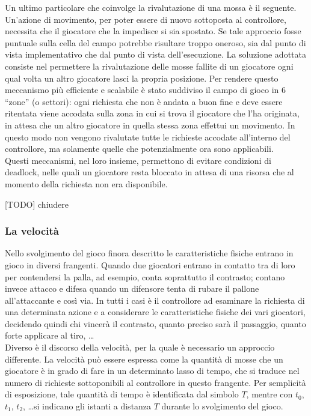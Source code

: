 Un ultimo particolare che coinvolge la rivalutazione di una mossa è il seguente. Un'azione di movimento, per poter essere di nuovo sottoposta al controllore, necessita che il giocatore che la impedisce si sia spostato. Se tale approccio fosse puntuale sulla cella del campo potrebbe risultare troppo oneroso, sia dal punto di vista implementativo che dal punto di vista dell'esecuzione. La soluzione adottata consiste nel permettere la rivalutazione delle mosse fallite di un giocatore ogni qual volta un altro giocatore lasci la propria posizione. Per rendere questo meccanismo più efficiente e scalabile è stato suddiviso il campo di gioco in 6 ``zone'' (o settori): ogni richiesta che non è andata a buon fine e deve essere ritentata viene accodata sulla zona in cui si trova il giocatore che l'ha originata, in attesa che un altro giocatore in quella stessa zona effettui un movimento. In questo modo non vengono rivalutate tutte le richieste accodate all'interno del controllore, ma solamente quelle che potenzialmente ora sono applicabili.\\

Questi meccanismi, nel loro insieme, permettono di evitare condizioni di deadlock, nelle quali un giocatore resta bloccato in attesa di una risorsa che al momento della richiesta non era disponibile.

[TODO] chiudere 

\subsubsection{La velocità}
\label{sec:analisi_concorrenza_velocita}

Nello svolgimento del gioco finora descritto le caratteristiche fisiche entrano in gioco in diversi frangenti. Quando due giocatori entrano in contatto tra di loro per contendersi la palla, ad esempio, conta soprattutto il contrasto; contano invece attacco e difesa quando un difensore tenta di rubare il pallone all'attaccante e così via. In tutti i casi è il controllore ad esaminare la richiesta di una determinata azione e a considerare le caratteristiche fisiche dei vari giocatori, decidendo quindi chi vincerà il contrasto, quanto preciso sarà il passaggio, quanto forte applicare al tiro, \ldots\\

Diverso è il discorso della velocità, per la quale è necessario un approccio differente. La velocità può essere espressa come la quantità di mosse che un giocatore è in grado di fare in un determinato lasso di tempo, che si traduce nel numero di richieste sottoponibili al controllore in questo frangente. Per semplicità di esposizione, tale quantità di tempo è identificata dal simbolo $T$, mentre con $t_0$, $t_1$, $t_2$, \ldots si indicano gli istanti a distanza $T$ durante lo svolgimento del gioco.\\


